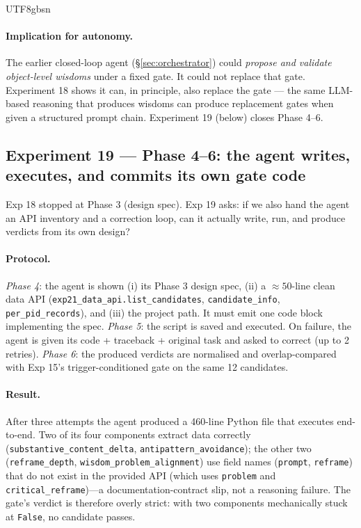 \documentclass{article}
\begin{document}
\begin{CJK*}{UTF8}{gbsn}
\paragraph{Implication for autonomy.} The earlier closed-loop
agent (\S\ref{sec:orchestrator}) could \emph{propose and
validate object-level wisdoms} under a fixed gate. It could not
replace that gate. Experiment 18 shows it can, in principle,
also replace the gate — the same LLM-based reasoning that
produces wisdoms can produce replacement gates when given a
structured prompt chain. Experiment 19 (below) closes Phase 4–6.

\subsection{Experiment 19 — Phase 4–6: the agent writes,
executes, and commits its own gate code}
\label{sec:meta-exec}

Exp 18 stopped at Phase 3 (design spec). Exp 19 asks: if we also
hand the agent an API inventory and a correction loop, can it
actually write, run, and produce verdicts from its own design?

\paragraph{Protocol.}
\emph{Phase 4}: the agent is shown (i) its Phase 3 design spec,
(ii) a \(\approx 50\)-line clean data API
(\texttt{exp21\_data\_api.list\_candidates}, \texttt{candidate\_info},
\texttt{per\_pid\_records}), and (iii) the project path. It must
emit one code block implementing the spec.
\emph{Phase 5}: the script is saved and executed. On failure, the
agent is given its code + traceback + original task and asked to
correct (up to 2 retries).
\emph{Phase 6}: the produced verdicts are normalised and
overlap-compared with Exp 15's trigger-conditioned gate on the
same 12 candidates.

\paragraph{Result.} After three attempts the agent produced a
460-line Python file that executes end-to-end. Two of its four
components extract data correctly (\texttt{substantive\_content\_delta},
\texttt{antipattern\_avoidance}); the other two
(\texttt{reframe\_depth}, \texttt{wisdom\_problem\_alignment})
use field names (\texttt{prompt}, \texttt{reframe}) that do not
exist in the provided API (which uses \texttt{problem} and
\texttt{critical\_reframe})—a documentation-contract slip, not a
reasoning failure. The gate's verdict is therefore overly strict:
with two components mechanically stuck at \texttt{False}, no
candidate passes.


\end{CJK*}
\end{document}
